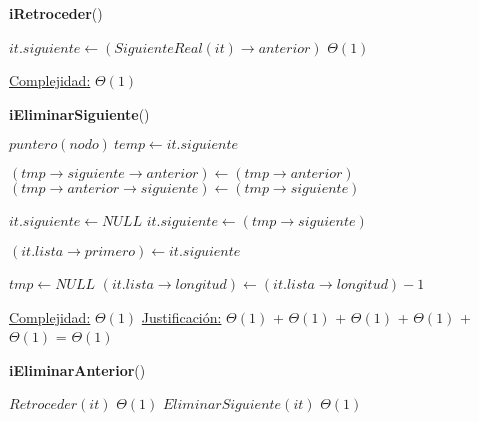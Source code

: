 \begin{Algoritmos}
\begin{algorithm}[H]
	\begin{algorithmic}[1]
		\State \textbf{iRetroceder}()
		
			\State $it.siguiente \gets (SiguienteReal(it)\rightarrow anterior)$	\Comment $\Theta(1)$

			\medskip
			\Statex \underline{Complejidad:} $\Theta(1)$
    	\end{algorithmic}
\end{algorithm}

	
\begin{algorithm}[H]
	\begin{algorithmic}[1]
		\State \textbf{iEliminarSiguiente}()
		
			\State $puntero(nodo) \ temp \gets it.siguiente$
			
			\State $(tmp\rightarrow siguiente\rightarrow anterior) \gets (tmp\rightarrow anterior)$
			\State $(tmp\rightarrow anterior\rightarrow siguiente) \gets (tmp\rightarrow siguiente)$
		
				\State $it.siguiente \gets NULL$
			\Else
				\State $it.siguiente \gets (tmp\rightarrow siguiente)$	
			\EndIf
			
				\State $(it.lista\rightarrow primero) \gets it.siguiente$
			\EndIf
			
			\State $tmp \gets NULL$	 
			\State $(it.lista\rightarrow longitud) \gets (it.lista\rightarrow longitud) - 1$

			\medskip
			\Statex \underline{Complejidad:} $\Theta(1)$
			\Statex \underline{Justificación:} $\Theta(1)$ + $\Theta(1)$ + $\Theta(1)$ + $\Theta(1)$ + $\Theta(1)$ =  $\Theta(1)$
    	\end{algorithmic}
\end{algorithm}
	
\begin{algorithm}[H]
	\begin{algorithmic}[1]
		\State \textbf{iEliminarAnterior}()
		
			\State $Retroceder(it)$	\Comment $\Theta(1)$
			\State $EliminarSiguiente(it)$	\Comment $\Theta(1)$


\end{algorithmic}
\end{algorithm}
\end{Algoritmos}
